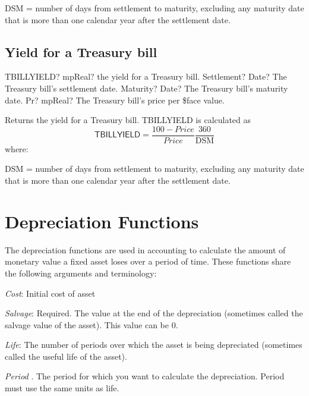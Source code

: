 DSM  = number of days from settlement to maturity, excluding any maturity date that is more than one calendar year after the settlement date.




\subsection{Yield for a Treasury bill}

\begin{mpFunctionsExtract}
	\mpWorksheetFunctionThreeNotImplemented
	{TBILLYIELD? mpReal? the yield for a Treasury bill.}
	{Settlement? Date?  The Treasury bill's settlement date.}
	{Maturity? Date? The Treasury bill's maturity date.}
	{Pr? mpReal? The Treasury bill's price per \$face value.}
\end{mpFunctionsExtract}

\vspace{0.3cm}
Returns the yield for a Treasury bill. TBILLYIELD is calculated as
\begin{equation}
\textsf{TBILLYIELD} = \frac{100-Price}{Price} \frac{360}{\text{DSM}}
\end{equation}
where:

DSM  = number of days from settlement to maturity, excluding any maturity date that is more than one calendar year after the settlement date.





\newpage
\section{Depreciation Functions}



\label{DepreciationFunctions}

The depreciation functions are used in accounting to calculate the amount of monetary value a fixed asset loses over a period of time. These functions share the following arguments and terminology:

\textit{Cost}: Initial cost of asset

\textit{Salvage}: Required. The value at the end of the depreciation (sometimes called the salvage value of the asset). This value can be 0.

\textit{Life}: The number of periods over which the asset is being depreciated (sometimes called the useful life of the asset).

\textit{Period} . The period for which you want to calculate the depreciation. Period must use the same units as life.

